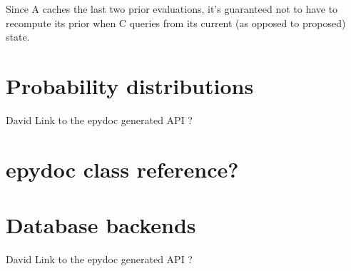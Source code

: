 \documentclass[]{book}
\begin{document}
Since A caches the last two prior evaluations, it's guaranteed not to have to recompute its prior when C queries from its current (as opposed to proposed) state.








\appendix

\chapter{Probability distributions}
David
Link to the epydoc generated API ?
\chapter{epydoc class reference?}

\chapter{Database backends}
David
Link to the epydoc generated API ?
\end{document}

